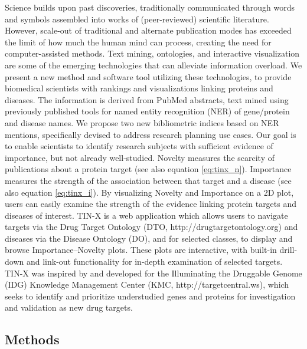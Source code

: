 Science builds upon past discoveries, traditionally communicated through words and symbols assembled into works of (peer-reviewed) scientific literature. However, scale-out of traditional and alternate publication modes has exceeded the limit of how much the human mind can process, creating the need for computer-assisted methods\cite{Hunter2006-om}. Text mining, ontologies, and interactive visualization are some of the emerging technologies that can alleviate information overload. We present a new method and software tool utilizing these technologies, to provide biomedical scientists with rankings and visualizations linking proteins and diseases.  The information is derived from PubMed abstracts, text mined using previously published tools for named entity recognition (NER) of gene/protein and disease names\cite{Pletscher-Frankild2015-oo,Szklarczyk2015-bl}. We propose two new bibliometric indices based on NER mentions, specifically devised to address research planning use cases. Our goal is to enable scientists to identify research subjects with sufficient evidence of importance, but not already well-studied. Novelty measures the scarcity of publications about a protein target (see also equation \ref{eq:tinx_n}). Importance measures the strength of the association between that target and a disease (see also equation \ref{eq:tinx_i}). By visualizing Novelty and Importance on a 2D plot, users can easily examine the strength of the evidence linking protein targets and diseases of interest. TIN-X is a web application which allows users to navigate targets via the Drug Target Ontology (DTO, http://drugtargetontology.org) and diseases via the Disease Ontology (DO)\cite{Kibbe2015-li}, and for selected classes, to display and browse Importance–Novelty plots. These plots are interactive, with built-in drill-down and link-out functionality for in-depth examination of selected targets. TIN-X was inspired by and developed for the Illuminating the Druggable Genome (IDG) Knowledge Management Center (KMC, http://targetcentral.ws), which seeks to identify and prioritize understudied genes and proteins for investigation and validation as new drug targets.

\subsection{Methods}

